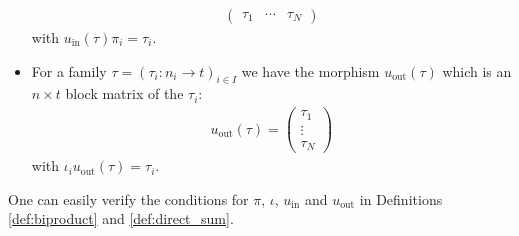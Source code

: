 \begin{example}
\begin{itemize}
\begin{align}
\begin{pmatrix}
\tau_{1} & \cdots & \tau_{N}
\end{pmatrix}
\end{align}
with $u_{\text{in}}(\tau) \pi_{i} = \tau_{i}$.
\item For a family $\tau = (\tau_{i} : n_{i} \rightarrow t)_{i \in I}$ we have the morphism $u_{\text{out}}(\tau)$ which is an $n \times t$ block matrix
of the $\tau_{i}$:
\begin{align}
u_{\text{out}}(\tau) = \label{eq:u_out_direct_sum_matrix}
\begin{pmatrix}
\tau_{1} \\
\vdots \\
\tau_{N}
\end{pmatrix}
\end{align}
with $\iota_{i} u_{\text{out}}(\tau) = \tau_{i}$.
\end{itemize}
One can easily verify the conditions for $\pi$, $\iota$, $u_{\text{in}}$ and $u_{\text{out}}$ in Definitions \ref{def:biproduct} and \ref{def:direct_sum}.
\end{example}

